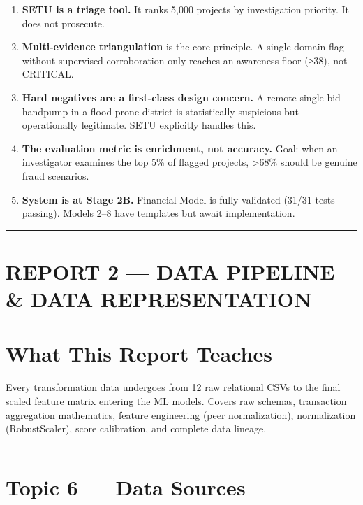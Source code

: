 \documentclass[11pt,a4paper]{article}
\begin{document}
\begin{enumerate}[leftmargin=1.5em, itemsep=2pt, topsep=3pt]
\item \textbf{SETU is a triage tool.} It ranks 5,000 projects by investigation priority. It does not prosecute.
\item \textbf{Multi-evidence triangulation} is the core principle. A single domain flag without supervised corroboration only reaches an awareness floor (≥38), not CRITICAL.
\item \textbf{Hard negatives are a first-class design concern.} A remote single-bid handpump in a flood-prone district is statistically suspicious but operationally legitimate. SETU explicitly handles this.
\item \textbf{The evaluation metric is enrichment, not accuracy.} Goal: when an investigator examines the top 5\% of flagged projects, >68\% should be genuine fraud scenarios.
\item \textbf{System is at Stage 2B.} Financial Model is fully validated (31/31 tests passing). Models 2–8 have templates but await implementation.
\end{enumerate}

\vspace{1em}\hrule\vspace{1em}

\clearpage
\section*{REPORT 2 --- DATA PIPELINE \& DATA REPRESENTATION}

\section{What This Report Teaches}

Every transformation data undergoes from 12 raw relational CSVs to the final scaled feature matrix entering the ML models. Covers raw schemas, transaction aggregation mathematics, feature engineering (peer normalization), normalization (RobustScaler), score calibration, and complete data lineage.

\vspace{1em}\hrule\vspace{1em}

\section{Topic 6 --- Data Sources}
\end{document}

